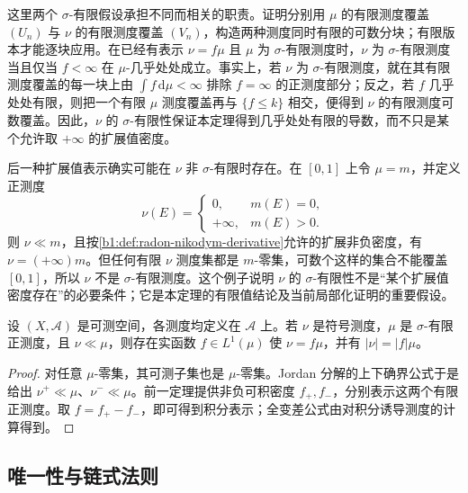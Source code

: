 这里两个 \(\sigma\)-有限假设承担不同而相关的职责。证明分别用 \(\mu\) 的有限测度覆盖 \((U_n)\) 与 \(\nu\) 的有限测度覆盖 \((V_n)\)，构造两种测度同时有限的可数分块；有限版本才能逐块应用。在已经有表示 \(\nu=f\mu\) 且 \(\mu\) 为 \(\sigma\)-有限测度时，\(\nu\) 为 \(\sigma\)-有限测度当且仅当 \(f<\infty\) 在 \(\mu\)-几乎处处成立。事实上，若 \(\nu\) 为 \(\sigma\)-有限测度，就在其有限测度覆盖的每一块上由 \(\int f\,\mathrm d\mu<\infty\) 排除 \(f=\infty\) 的正测度部分；反之，若 \(f\) 几乎处处有限，则把一个有限 \(\mu\) 测度覆盖再与 \(\{f\leq k\}\) 相交，便得到 \(\nu\) 的有限测度可数覆盖。因此，\(\nu\) 的 \(\sigma\)-有限性保证本定理得到几乎处处有限的导数，而不只是某个允许取 \(+\infty\) 的扩展值密度。

\ProseParagraphBreak

后一种扩展值表示确实可能在 \(\nu\) 非 \(\sigma\)-有限时存在。在 \([0,1]\) 上令 \(\mu=m\)，并定义正测度
\[
\nu(E)=
\begin{cases}
0,&m(E)=0,\\
+\infty,&m(E)>0.
\end{cases}
\]
则 \(\nu\ll m\)，且按\cref{b1:def:radon-nikodym-derivative}允许的扩展非负密度，有 \(\nu=(+\infty)m\)。但任何有限 \(\nu\) 测度集都是 \(m\)-零集，可数个这样的集合不能覆盖 \([0,1]\)，所以 \(\nu\) 不是 \(\sigma\)-有限测度。这个例子说明 \(\nu\) 的 \(\sigma\)-有限性不是“某个扩展值密度存在”的必要条件；它是本定理的有限值结论及当前局部化证明的重要假设。

\begin{corollary}\label{b1:cor:signed-radon-nikodym}
设 \((X,\mathcal A)\) 是可测空间，各测度均定义在 \(\mathcal A\) 上。若 \(\nu\) 是符号测度，\(\mu\) 是 \(\sigma\)-有限正测度，且 \(\nu\ll\mu\)，则存在实函数 \(f\in L^1(\mu)\) 使 \(\nu=f\mu\)，并有 \(|\nu|=|f|\mu\)。
\end{corollary}
\begin{proof}
对任意 \(\mu\)-零集，其可测子集也是 \(\mu\)-零集。Jordan 分解的上下确界公式于是给出 \(\nu^+\ll\mu\)、\(\nu^-\ll\mu\)。前一定理提供非负可积密度 \(f_+,f_-\)，分别表示这两个有限正测度。取 \(f=f_+-f_-\)，即可得到积分表示；全变差公式由对积分诱导测度的计算得到。
\end{proof}

\subsection{唯一性与链式法则}
\label{b1:subsec:060403}

